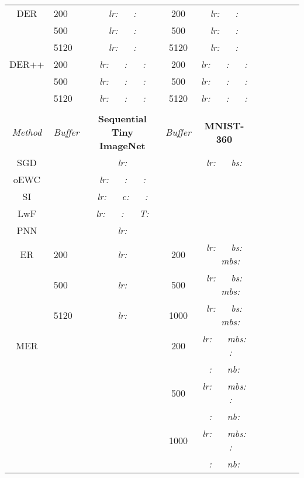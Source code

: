 \documentclass{article}
\newcommand{\xmark}{\textbf{\textendash}}
\begin{document}
\begin{table}[H]
\begin{tabular}{| Sl | Sc | Sl | Sc | Sl |}
DER     & 200    & \textit{lr:}    ~~ \textit{:}  & 200  & \textit{lr:}   ~~ \textit{:}  \\
        & 500    & \textit{lr:}    ~~ \textit{:}  & 500  & \textit{lr:}   ~~ \textit{:}  \\
        & 5120   & \textit{lr:}    ~~ \textit{:}  & 5120 & \textit{lr:}   ~~ \textit{:}  \\
DER++   & 200    & \textit{lr:}   ~~ \textit{:}  ~~ \textit{:}  & 200 & \textit{lr:}   ~~ \textit{:}  ~~ \textit{:}  \\
        & 500    & \textit{lr:}     ~~ \textit{:}  ~~ \textit{:}  & 500 & \textit{lr:}   ~~ \textit{:}  ~~ \textit{:}  \\
        & 5120   & \textit{lr:}     ~~ \textit{:}  ~~ \textit{:}  & 5120 & \textit{lr:}   ~~ \textit{:}  ~~ \textit{:}  \\
        & & & & \\
\hline
\textit{Method} & \textit{Buffer} & \textbf{Sequential Tiny ImageNet} & \textit{Buffer} & \textbf{MNIST-360} \\
\hline
SGD & \xmark & \textit{lr:}  & \xmark & \textit{lr:}  ~~ \textit{bs:}  \\
oEWC    & \xmark & \textit{lr:}  ~~ \textit{:}  ~~ \textit{:}  & & \\
SI      & \xmark & \textit{lr:}  ~~ \textit{c:}  ~~ \textit{:}  & & \\
LwF     & \xmark & \textit{lr:}  ~~ \textit{: } ~~ \textit{T:}  & & \\
PNN     & \xmark & \textit{lr:}  & & \\
ER      & 200    & \textit{lr:}   & 200    & \textit{lr:}  ~~ \textit{bs:}  ~~ \textit{mbs:}  \\
        & 500    & \textit{lr:}    & 500    & \textit{lr:}  ~~ \textit{bs:}  ~~ \textit{mbs:}  \\
        & 5120   & \textit{lr:}   & 1000   & \textit{lr:}  ~~ \textit{bs:}  ~~ \textit{mbs:}  \\
MER     & & & 200  & \textit{lr:}   ~~  \textit{mbs:}  ~~ \textit{:}  \\
        & & & & \textit{:}  ~~ \textit{nb:}  \\
        & & & 500  & \textit{lr:}   ~~  \textit{mbs:}  ~~ \textit{:}  \\
        & & & & \textit{:}  ~~ \textit{nb:} \\
        & & & 1000 & \textit{lr:}  ~~  \textit{mbs:}  ~~ \textit{:}  \\
        & & & & \textit{:}  ~~ \textit{nb:} \\

\end{tabular}
\end{table}
\end{document}
